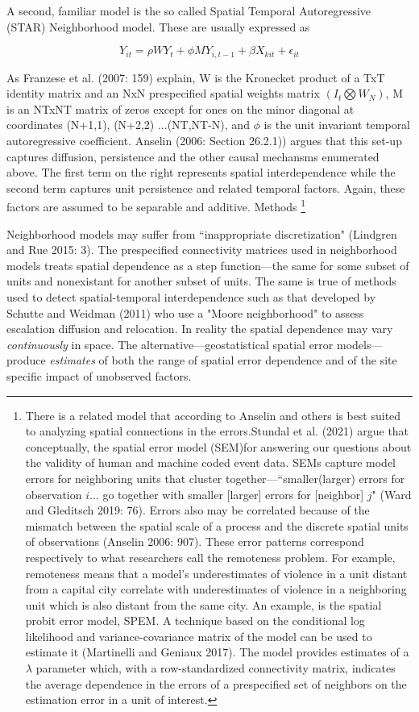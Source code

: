 \documentclass[12pt]{article}
\begin{document}
A second, familiar model is the so called Spatial Temporal Autoregressive (STAR) Neighborhood
model. These are usually expressed as

\begin{equation}
Y_{it} = \rho W Y_{t} + \phi M Y_{i,t-1} + \beta X_{kit} + \epsilon_{it}
\end{equation}

As Franzese et al. (2007: 159) explain, W is the
Kronecket product of a TxT identity matrix and an NxN prespecified spatial weights matrix
$(I_t \bigotimes W_N)$, M is an NTxNT matrix of zeros except for ones on the minor
diagonal at coordinates (N+1,1), (N+2,2) ...(NT,NT-N), and $\phi$ is the unit invariant
temporal autoregressive coefficient. Anselin (2006: Section 26.2.1)) argues that this set-up captures
diffusion, persistence and the other causal mechansms enumerated above. The first term on the right represents
spatial interdependence while the second term captures unit persistence and related
temporal factors. Again, these factors are assumed to be separable and additive. Methods
\footnote
{There is a related model that according to Anselin and others is best suited to
analyzing spatial connections in the errors.Stundal et al. (2021) argue that conceptually, the
spatial error model (SEM)for answering our questions about
the validity of human and machine coded event data. SEMs capture model errors for
neighboring units that cluster together---``smaller(larger) errors for observation $i \ldots$
go together with smaller [larger] errors for [neighbor] $j$" (Ward and Gleditsch 2019: 76).
Errors also may be correlated because of the mismatch between the spatial scale of a process
and the discrete spatial units of observations (Anselin 2006: 907). These error patterns
correspond respectively to what researchers call the remoteness problem. For example,
remoteness means that a model's underestimates of violence in a unit distant from a
capital city correlate with underestimates of violence in a neighboring unit which is
also distant from the same city. An example, is the spatial probit error model, SPEM.
A technique based on the conditional log likelihood and variance-covariance matrix of
the model can be used to estimate it (Martinelli and Geniaux 2017). The model provides
estimates of a $\lambda$ parameter which, with a row-standardized connectivity matrix,
indicates the average dependence in the errors of a prespecified set of neighbors on
the estimation error in a unit of interest.}

 Neighborhood models may suffer from ``inappropriate discretization" (Lindgren and Rue 2015: 3).
 The prespecified connectivity matrices used in neighborhood models treats spatial dependence
 as a step function---the same for some subset of units and nonexistant for another subset of
 units. The same is true of methods used to detect spatial-temporal interdependence such as
 that developed by Schutte and Weidman (2011) who use a "Moore neighborhood" to assess
 escalation diffusion and relocation. In reality the spatial dependence may vary \textit{continuously}
 in space.  The alternative---geostatistical spatial error models---produce \textit{estimates}
 of both the range of spatial error dependence and of the site specific impact of unobserved
 factors.
\end{document}
